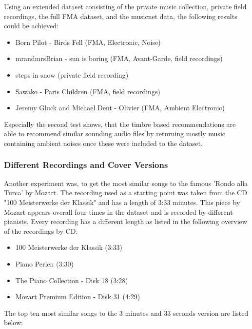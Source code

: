 \noindent Using an extended dataset consisting of the private music collection, private field recordings, the full FMA dataset, and the musicnet data, the following results could be achieved: 

\begin{itemize}
	\setlength\itemsep{-0.5em}
	\item Born Pilot - Birds Fell (FMA, Electronic, Noise)
	\item mrandmrsBrian - sun is boring (FMA, Avant-Garde, field recordings)
	\item steps in snow (private field recording)
	\item Sawako - Paris Children (FMA, field recordings)
	\item Jeremy Gluck and Michael Dent - Olivier (FMA, Ambient Electronic)
\end{itemize}

\noindent Especially the second test shows, that the timbre based recommendations are able to recommend similar sounding audio files by returning mostly music containing ambient noises once these were included to the dataset.

\subsubsection{Different Recordings and Cover Versions}\label{covermfcc}
Another experiment was, to get the most similar songs to the famous 'Rondo alla Turca' by Mozart.
The recording used as a starting point was taken from the CD "100 Meisterwerke der Klassik" and has a length of 3:33 minutes. This piece by Mozart appears overall four times in the dataset and is recorded by different pianists.
Every recording has a different length as listed in the following overview of the recordings by CD.

\begin{itemize}
	\setlength\itemsep{-0.5em}
	\item 100 Meisterwerke der Klassik (3:33)
	\item Piano Perlen (3:30)
	\item The Piano Collection - Disk 18 (3:28)
	\item Mozart Premium Edition - Disk 31 (4:29)
	
\end{itemize}

\noindent The top ten most similar songs to the 3 minutes and 33 seconds version are listed below:

